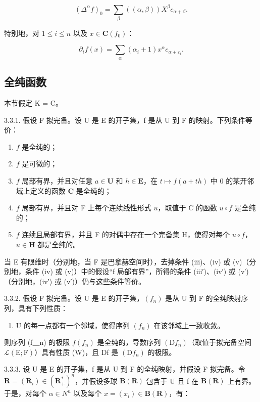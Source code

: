 \[
(\Delta^ {\alpha} f) _ {0} = \sum_ {\beta} ((\alpha , \beta)) X ^ {\beta} c _ {\alpha + \beta}.
\]

特别地，对 \(1 \leqslant i \leqslant n\) 以及 \(x \in \mathbf{C}(f_0)\)：

\[
\partial_ {i} f (x) = \sum_ {\alpha} (\alpha_ {i} + 1) x ^ {\alpha} c _ {\alpha + \varepsilon_ {i}}.
\]

\subsection{全纯函数}

本节假定 K = C。

3.3.1. 假设 F 拟完备。设 U 是 E 的开子集，f 是从 U 到 F 的映射。下列条件等价：

\begin{enumerate}
\def\labelenumi{(\roman{enumi})}
\item
  \(f\) 是全纯的；
\item
  \(f\) 是可微的；
\item
  \(f\) 局部有界，并且对任意 \(a \in \mathbf{U}\) 和 \(h \in \mathbf{E}\)，在 \(t \mapsto f(a + th)\) 中 0 的某开邻域上定义的函数 \(\mathbf{C}\) 是全纯的；
\item
  \(f\) 局部有界，并且对 F 上每个连续线性形式 \(u\)，取值于 C 的函数 \(u \circ f\) 是全纯的；
\item
  \(f\) 连续且局部有界，并且 F 的对偶中存在一个完备集 H，使得对每个 \(u \circ f\)，\(u \in \mathbf{H}\) 都是全纯的。
\end{enumerate}

当 E 有限维时（分别地，当 F 是巴拿赫空间时），去掉条件 (iii)、(iv) 或 (v)（分别地，条件 (iv) 或 (v)）中的假设“f 局部有界”，所得的条件 (iii′)、(iv′) 或 (v′)（分别地，(iv′) 或 (v′)）仍与这些条件等价。

3.3.2. 假设 F 拟完备。设 U 是 E 的开子集，\((f_{n})\) 是从 U 到 F 的全纯映射序列，具有下列性质：

\begin{enumerate}
\def\labelenumi{(\Alph{enumi})}
\setcounter{enumi}{22}
\tightlist
\item
  U 的每一点都有一个邻域，使得序列 \((f_{n})\) 在该邻域上一致收敛。
\end{enumerate}

则序列 (f＿n) 的极限 \(f\)\((f_{n})\) 是全纯的，导数序列 \((\mathrm{D}f_{n})\)（取值于拟完备空间 \(\mathcal{L}(\mathrm{E};\mathrm{F})\)）具有性质 (W)，且 Df 是 \((\mathrm{D}f_{n})\) 的极限。

3.3.3. 设 U 是 E 的开子集，f 是从 U 到 F 的全纯映射，并假设 F 拟完备。令 \(\mathbf{R} = (\mathbf{R}_{i}) \in (\mathbf{R}_{+}^{*})^{n}\)，并假设多球 \(\mathbf{B}(\mathbf{R})\) 包含于 U 且 f 在 \(\mathbf{B}(\mathbf{R})\) 上有界。于是，对每个 \(\alpha \in N^{n}\) 以及每个 \(x = (x_{i}) \in \mathbf{B}(\mathbf{R})\)，有：

